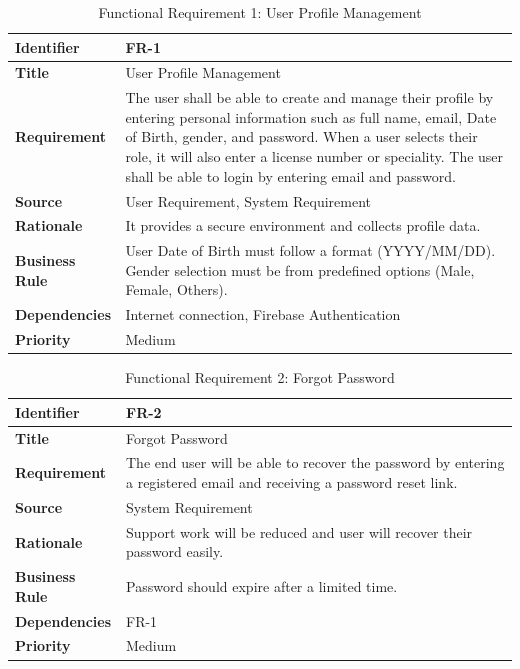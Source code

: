 
\begin{table}[H]
\centering
\caption{Functional Requirement 1: User Profile Management}
\begin{tabularx}{\textwidth}{|l|X|}
\hline
\textbf{Identifier} & FR-1 \\ \hline
\textbf{Title} & User Profile Management \\ \hline
\textbf{Requirement} & The user shall be able to create and manage their profile by entering personal information such as full name, email, Date of Birth, gender, and password. When a user selects their role, it will also enter a license number or speciality. The user shall be able to login by entering email and password. \\ \hline
\textbf{Source} & User Requirement, System Requirement \\ \hline
\textbf{Rationale} & It provides a secure environment and collects profile data. \\ \hline
\textbf{Business Rule} & User Date of Birth must follow a format (YYYY/MM/DD). Gender selection must be from predefined options (Male, Female, Others). \\ \hline
\textbf{Dependencies} & Internet connection, Firebase Authentication \\ \hline
\textbf{Priority} & Medium \\ \hline
\end{tabularx}
\end{table}

\begin{table}[H]
\centering
\caption{Functional Requirement 2: Forgot Password}
\begin{tabularx}{\textwidth}{|l|X|}
\hline
\textbf{Identifier} & FR-2 \\ \hline
\textbf{Title} & Forgot Password \\ \hline
\textbf{Requirement} & The end user will be able to recover the password by entering a registered email and receiving a password reset link. \\ \hline
\textbf{Source} & System Requirement \\ \hline
\textbf{Rationale} & Support work will be reduced and user will recover their password easily. \\ \hline
\textbf{Business Rule} & Password should expire after a limited time. \\ \hline
\textbf{Dependencies} & FR-1 \\ \hline
\textbf{Priority} & Medium \\ \hline
\end{tabularx}
\end{table}

